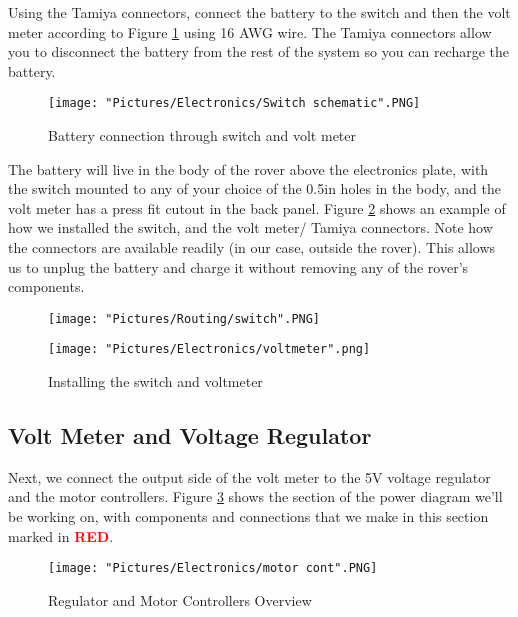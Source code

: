 \documentclass[12pt]{article}
\begin{document}
Using the Tamiya connectors, connect the battery to the switch and then the volt meter according to Figure \ref{sw sch} using 16 AWG wire. The Tamiya connectors allow you to disconnect the battery from the rest of the system so you can recharge the battery. 

\begin{figure}[H]
  	\centering
    	\texttt{[image: "Pictures/Electronics/Switch schematic".PNG]}
 	\caption{Battery connection through switch and volt meter}
	\label{sw sch}
\end{figure}



The battery will live in the body of the rover above the electronics plate, with the switch mounted to any of your choice of the 0.5in holes in the body, and the volt meter has a press fit cutout in the back panel. Figure \ref{vms} shows an example of how we installed the switch, and the volt meter/ Tamiya connectors. Note how the connectors are available readily (in our case, outside the rover). This allows us to unplug the battery and charge it without removing any of the rover's components. 


\begin{figure}[H]
 	\centering
  	\begin{minipage}[b]{0.40\textwidth}
		\texttt{[image: "Pictures/Routing/switch".PNG]}
  	\end{minipage}
  	\hfill
  	\begin{minipage}[b]{0.50\textwidth}
    		\texttt{[image: "Pictures/Electronics/voltmeter".png]}
  	\end{minipage}
	\caption{Installing the switch and voltmeter}
	\label{vms}
\end{figure}



\subsection{Volt Meter and Voltage Regulator}
Next, we connect the output side of the volt meter to the 5V voltage regulator and the motor controllers. Figure \ref{motor cont} shows the section of the power diagram we'll be working on, with components and connections that we make in this section marked in \textcolor{red}{\textbf{RED}}.

\begin{figure}[H]
  	\centering
    	\texttt{[image: "Pictures/Electronics/motor cont".PNG]}
 	\caption{Regulator and Motor Controllers Overview}
	\label{motor cont}
\end{figure}
\end{document}
